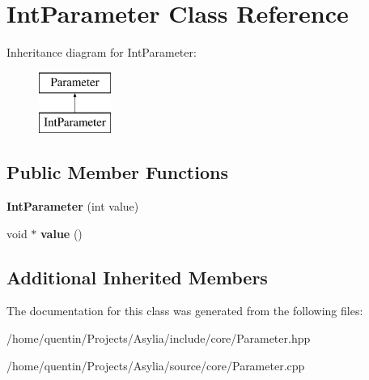 \hypertarget{classIntParameter}{\section{Int\-Parameter Class Reference}
\label{classIntParameter}
}
Inheritance diagram for Int\-Parameter\-:\begin{figure}[H]
\begin{center}
\leavevmode
\includegraphics[height=2.000000cm]{classIntParameter}
\end{center}
\end{figure}
\subsection*{Public Member Functions}
\begin{DoxyCompactItemize}
\item 
\hypertarget{classIntParameter_aadb5832cdecc3695e0bc38ac3592c618}{{\bfseries Int\-Parameter} (int value)}\label{classIntParameter_aadb5832cdecc3695e0bc38ac3592c618}

\item 
\hypertarget{classIntParameter_a2a535cb68288e7d5de039d201b84f3e6}{void $\ast$ {\bfseries value} ()}\label{classIntParameter_a2a535cb68288e7d5de039d201b84f3e6}

\end{DoxyCompactItemize}
\subsection*{Additional Inherited Members}


The documentation for this class was generated from the following files\-:\begin{DoxyCompactItemize}
\item 
/home/quentin/\-Projects/\-Asylia/include/core/Parameter.\-hpp\item 
/home/quentin/\-Projects/\-Asylia/source/core/Parameter.\-cpp\end{DoxyCompactItemize}
